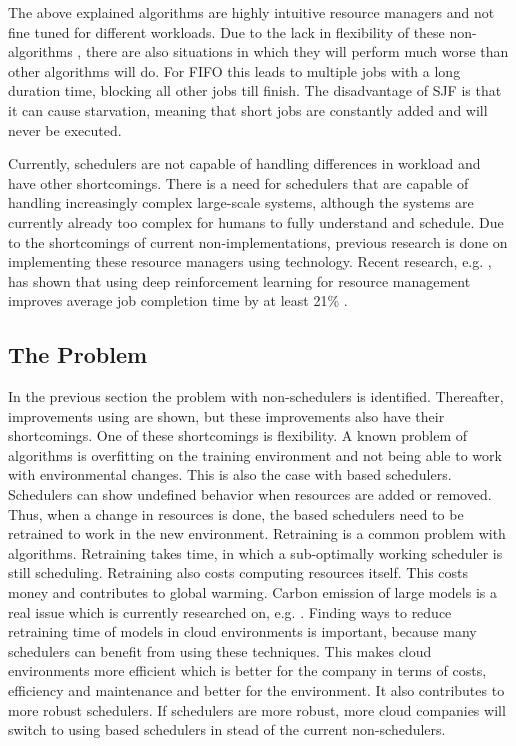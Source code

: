 The above explained algorithms are highly intuitive resource managers and not
fine tuned for different workloads. Due to the lack in flexibility of these
non-\ai algorithms , there are also situations in which they will perform much
worse than other algorithms will do. For FIFO this leads to multiple jobs with
a long duration time, blocking all other jobs till finish. The disadvantage of
SJF is that it can cause starvation, meaning that short jobs are constantly
added and will never be executed.

Currently, schedulers are not capable of handling differences in workload and
have other shortcomings. There is a need for schedulers that are capable of
handling increasingly complex large-scale systems, although the systems are
currently already too complex for humans to fully understand and schedule. Due
to the shortcomings of current non-\ai implementations, previous research is
done on implementing these resource managers using \ai technology. Recent
research, e.g. , has shown that
using deep reinforcement learning for resource management improves average job
completion time by at least 21\% \cite{mao2019}.

\subsection{The Problem}

In the previous section the problem with non-\ai schedulers is identified.
Thereafter, improvements using \rl are shown, but these \rl improvements also
have their shortcomings. One of these shortcomings is flexibility. A known
problem of \ml algorithms is overfitting on the training
environment and not being able to work with environmental changes. This is
also the case with \rl based schedulers. Schedulers can show undefined behavior
when resources are added or removed. Thus, when a change in resources is done,
the \rl based schedulers need to be retrained to work in the new environment.
Retraining is a common problem with \ml algorithms. Retraining
takes time, in which a sub-optimally working scheduler is still scheduling.
Retraining also costs computing resources itself. This costs money and
contributes to global warming. Carbon emission of large \ml
models is a real issue which is currently researched on, e.g.
. Finding ways to reduce retraining time of \rl models in
cloud environments is important, because many schedulers can benefit from
using these techniques. This makes cloud environments more efficient which is
better for the company in terms of costs, efficiency and maintenance and
better for the environment. It also contributes to more robust \rl schedulers.
If \rl schedulers are more robust, more cloud companies will switch to using \rl
based schedulers in stead of the current non-\ai schedulers.

